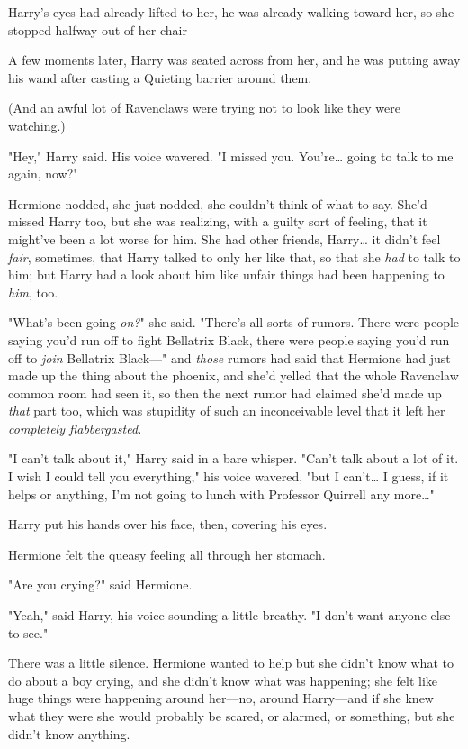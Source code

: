 Harry's eyes had already lifted to her, he was already walking toward her, so 
she stopped halfway out of her chair---

A few moments later, Harry was seated across from her, and he was putting away 
his wand after casting a Quieting barrier around them.

(And an awful lot of Ravenclaws were trying not to look like they were 
watching.)

"Hey," Harry said. His voice wavered. "I missed you. You're{\ldots} going to 
talk to me again, now?"

Hermione nodded, she just nodded, she couldn't think of what to say. She'd 
missed Harry too, but she was realizing, with a guilty sort of feeling, that it 
might've been a lot worse for him. She had other friends, Harry{\ldots} it 
didn't feel \emph{fair}, sometimes, that Harry talked to only her like that, so 
that she \emph{had} to talk to him; but Harry had a look about him like unfair 
things had been happening to \emph{him}, too.

"What's been going \emph{on?}" she said. "There's all sorts of rumors. There 
were people saying you'd run off to fight Bellatrix Black, there were people 
saying you'd run off to \emph{join} Bellatrix Black---" and \emph{those} rumors 
had said that Hermione had just made up the thing about the phoenix, and she'd 
yelled that the whole Ravenclaw common room had seen it, so then the next rumor 
had claimed she'd made up \emph{that} part too, which was stupidity of such an 
inconceivable level that it left her \emph{completely flabbergasted.}

"I can't talk about it," Harry said in a bare whisper. "Can't talk about a lot 
of it. I wish I could tell you everything," his voice wavered, "but I 
can't{\ldots} I guess, if it helps or anything, I'm not going to lunch with 
Professor Quirrell any more{\ldots}"

Harry put his hands over his face, then, covering his eyes.

Hermione felt the queasy feeling all through her stomach.

"Are you crying?" said Hermione.

"Yeah," said Harry, his voice sounding a little breathy. "I don't want anyone 
else to see."

There was a little silence. Hermione wanted to help but she didn't know what to 
do about a boy crying, and she didn't know what was happening; she felt like 
huge things were happening around her---no, around Harry---and if she knew what 
they were she would probably be scared, or alarmed, or something, but she 
didn't know anything.

